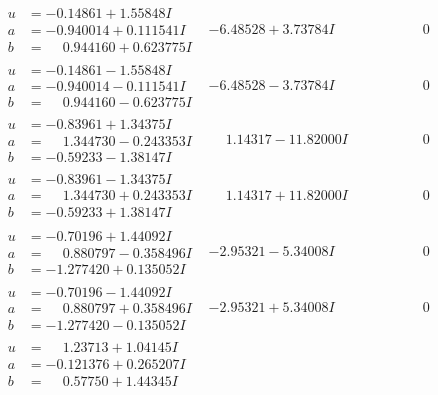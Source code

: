 \documentclass[1p]{elsarticle_modified}
\theoremstyle{definition}
\begin{document}
$$\begin{array}{c|c|c}
 \hline 
\begin{aligned}
u &= -0.14861 + 1.55848 I \\
a &= -0.940014 + 0.111541 I \\
b &= \phantom{-}0.944160 + 0.623775 I\end{aligned}
 & -6.48528 + 3.73784 I & \phantom{-0.000000 } 0 \\ \hline\begin{aligned}
u &= -0.14861 - 1.55848 I \\
a &= -0.940014 - 0.111541 I \\
b &= \phantom{-}0.944160 - 0.623775 I\end{aligned}
 & -6.48528 - 3.73784 I & \phantom{-0.000000 } 0 \\ \hline\begin{aligned}
u &= -0.83961 + 1.34375 I \\
a &= \phantom{-}1.344730 - 0.243353 I \\
b &= -0.59233 - 1.38147 I\end{aligned}
 & \phantom{-}1.14317 - 11.82000 I & \phantom{-0.000000 } 0 \\ \hline\begin{aligned}
u &= -0.83961 - 1.34375 I \\
a &= \phantom{-}1.344730 + 0.243353 I \\
b &= -0.59233 + 1.38147 I\end{aligned}
 & \phantom{-}1.14317 + 11.82000 I & \phantom{-0.000000 } 0 \\ \hline\begin{aligned}
u &= -0.70196 + 1.44092 I \\
a &= \phantom{-}0.880797 - 0.358496 I \\
b &= -1.277420 + 0.135052 I\end{aligned}
 & -2.95321 - 5.34008 I & \phantom{-0.000000 } 0 \\ \hline\begin{aligned}
u &= -0.70196 - 1.44092 I \\
a &= \phantom{-}0.880797 + 0.358496 I \\
b &= -1.277420 - 0.135052 I\end{aligned}
 & -2.95321 + 5.34008 I & \phantom{-0.000000 } 0 \\ \hline\begin{aligned}
u &= \phantom{-}1.23713 + 1.04145 I \\
a &= -0.121376 + 0.265207 I \\
b &= \phantom{-}0.57750 + 1.44345 I\end{aligned}

\end{array}$$
\end{document}
